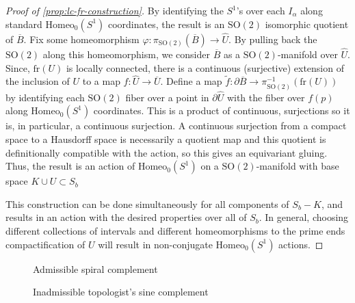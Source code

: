 \documentclass[10pt, oneside]{article}
\newcommand{\SO}[1][2]{\text{SO}(#1)}
\newcommand{\homeo}[1][S^1]{\text{Homeo}_0(#1)}
\newcommand{\cl}[1]{\overline{#1}}
\newcommand{\fr}[1]{\text{fr}(#1)}
\theoremstyle{definition}
\newtheorem{prop}{Proposition}[section]
\theoremstyle{definition}
\begin{document}
\begin{proof}[Proof of \cref{prop:lc-fr-construction}]
    By identifying the $S^1$'s over each $I_\alpha$ along standard $\homeo$ coordinates, the result is an $\SO$ isomorphic quotient of $\cl{B}$. Fix some homeomorphism $\varphi: \pi_{\SO}(\cl{B}) \to \hat{U}$. By pulling back the $\SO$ along this homeomorphism, we consider $\cl{B}$ as a $\SO$-manifold over $\hat{U}$. Since, $\fr{U}$ is locally connected, there is a continuous (surjective) extension of the inclusion of $U$ to a map $f:\hat{U}\to \cl{U}$\cite{mather_topological_1982}. Define a map $\tilde{f}:\partial\cl{B}\to\pi_{\SO}^{-1}(\fr{U})$ by identifying each $\SO$ fiber over a point in $\partial\hat{U}$ with the fiber over $f(p)$ along $\homeo$ coordinates. This is a product of continuous, surjections so it is, in particular, a continuous surjection. A continuous surjection from a compact space to a Hausdorff space is necessarily a quotient map and this quotient is definitionally compatible with the action, so this gives an equivariant gluing. Thus, the result is an action of $\homeo$ on a $\SO$-manifold with base space $K\cup U\subset S_b$

    This construction can be done simultaneously for all components of $S_b - K$, and results in an action with the desired properties over all of $S_b$. In general, choosing different collections of intervals and different homeomorphisms to the prime ends compactification of $U$ will result in non-conjugate $\homeo$ actions.
\end{proof}
\begin{figure}[t]
\centering
\begin{minipage}{.5\textwidth}
    \centering
    
    \caption{Admissible spiral complement}
    \label{fig:admissible-spiral}
\end{minipage}%
\begin{minipage}{.5\textwidth}
    \centering
    
    \caption{Inadmissible topologist's sine complement}
    \label{fig:inadmissible-top-sin}
\end{minipage}
\end{figure}



\end{document}
